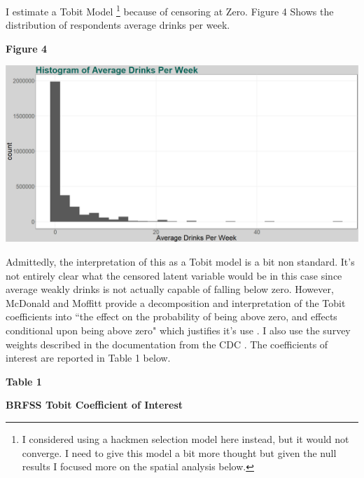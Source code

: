\documentclass[11pt]{article}
\begin{document}
I estimate a Tobit Model  \footnote{I considered using a hackmen selection model here instead, but it would not converge. I need to give this model a bit more thought but given the null results I focused more on the spatial analysis below.} because of censoring at Zero. Figure 4 Shows the distribution of respondents average drinks per week. 

\begin{center}
	
	\centering
	\textbf{Figure 4}\par\medskip
	\includegraphics[width=1\linewidth]{Hist_nm_aved_week.png}
\end{center}

Admittedly, the interpretation of this as a Tobit model is a bit non standard. It's not entirely clear what the censored latent variable would be in this case since average weakly drinks is not actually capable of falling below zero. However, McDonald and Moffitt provide a decomposition and interpretation of the Tobit coefficients into ``the effect on the probability of being above zero, and effects conditional upon being above zero" which justifies it's use \cite{Mcdon_moffit}. I also use the survey weights described in the documentation from the CDC \cite{BRFSS_weights}. The coefficients of interest are reported in Table 1 below. 


\begin{center}
	
	\centering
		\LARGE{\textbf{Table 1}}\par\medskip
		
	\normalsize{\textbf{BRFSS Tobit Coefficient of Interest}}\par\medskip
	\scalebox{1}{
		
	}
\end{center}
\end{document}
